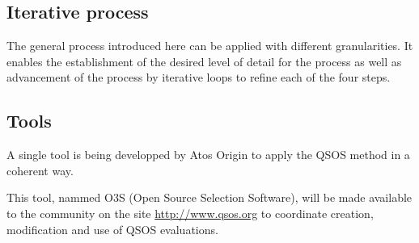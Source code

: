 \subsection{Iterative process}
The general process introduced here can be applied with different granularities. 
It enables the establishment of the desired level of detail for the process as well as advancement of the process by 
iterative loops to refine each of the four steps.


\subsection{Tools}
A single tool is being developped by Atos Origin to apply the QSOS method in a coherent way.

This tool, nammed O3S (Open Source Selection Software), will be made available to the community on the site \url{http://www.qsos.org} to coordinate creation, modification and use of QSOS evaluations.


